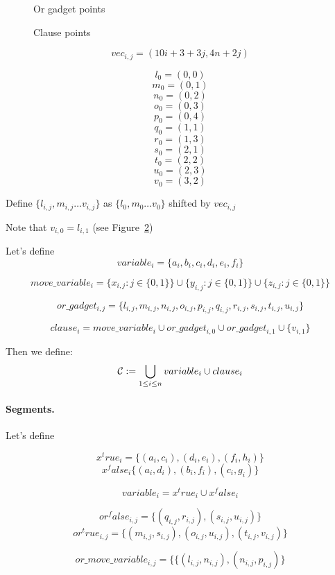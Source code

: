 	
	
\begin{figure}[h]
\centering
\def\svgwidth{0.5\columnwidth}

\caption{Or gadget points}
\label{fig:apx_or_gadget}
\end{figure}


\begin{figure}[h]
\centering
\def\svgwidth{0.8\columnwidth}

\caption{Clause points}
\label{fig:apx_clause}
\end{figure}
	$$vec_{i, j} = (10i + 3 + 3j, 4n + 2j)$$
	
	$$l_0 = (0, 0)$$
	$$m_0 = (0, 1)$$
	$$n_0 = (0, 2)$$
	$$o_0 = (0, 3)$$
	$$p_0 = (0, 4)$$
	$$q_0 = (1, 1)$$
	$$r_0 = (1, 3)$$
	$$s_0 = (2, 1)$$
	$$t_0 = (2, 2)$$
	$$u_0 = (2, 3)$$
	$$v_0 = (3, 2)$$
	
	
	Define 
	$\{ l_{i, j}, m_{i, j} \ldots v_{i, j} \}$
	as $\{l_0, m_0 \ldots v_0\}$ shifted by $vec_{i, j}$

Note that $v_{i, 0} = l_{i, 1}$ (see Figure~\ref{fig:apx_clause})

Let's define $$variable_i =  \{a_i, b_i, c_i, d_i, e_i, f_i\}$$	
 
 $$move\_variable_i = 
 \{x_{i, j} : j \in \{0, 1\}\} \cup
 \{y_{i, j} : j \in \{0, 1\}\} \cup
 \{z_{i, j} : j \in \{0, 1\}\} 
 $$
 
 $$or\_gadget_{i, j} = 
 \{l_{i, j}, m_{i, j}, n_{i, j}, o_{i, j},
 p_{i, j}, q_{i, j}, r_{i, j}, s_{i, j}, t_{i, j}, u_{i, j} \}
 $$
 
 $$clause_i = 
 move\_variable_i \cup or\_gadget_{i, 0} \cup or\_gadget_{i, 1} \cup \{v_{i, 1} \} 
 $$
 

Then we define:
$$\mathcal{C} := \bigcup_{1 \le i \le n} variable_i \cup clause_i $$


\paragraph{Segments.}

Let's define 

$$x^true_i = \{(a_i, c_i), (d_i, e_i), (f_i, h_i)\}$$
$$x^false_i \{ (a_i, d_i), (b_i, f_i), (c_i, g_i)\}$$

$$variable_i = x^true_i \cup x^false_i$$

$$or^false_{i, j} = \{ (q_{i, j}, r_{i, j}), (s_{i, j}, u_{i, j})\}$$
$$or^true_{i, j} = \{ (m_{i, j}, s_{i, j}), (o_{i, j}, u_{i, j}),(t_{i, j}, v_{i, j}) \}$$

$$or\_move\_variable_{i, j} = \{ \{ (l_{i, j}, n_{i, j}), (n_{i, j}, p_{i, j})\}$$

